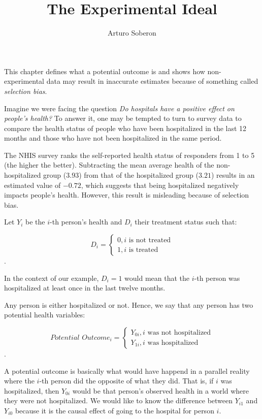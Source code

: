 \documentclass[12pt]{article}
\begin{document}
\title{The Experimental Ideal}
\author{Arturo Soberon}
\maketitle

This chapter defines what a potential outcome is and shows how non-experimental
data may result in inaccurate estimates because of something called 
\textit{selection bias}.

Imagine we were facing the question \textit{Do hospitals have a positive
effect on people's health?} To answer it, one may be tempted to turn to survey
data to compare the health status of people who have been hospitalized in the
last 12 months and those who have not been hospitalized in the same period.

The NHIS survey ranks the self-reported health status of responders from 1 to 
5 (the higher the better). Subtracting the mean average health of the
non-hospitalized group ($3.93$) from that of the hospitalized group ($3.21$)
results in an estimated value of $-0.72$, which suggests that being
hospitalized negatively impacts people's health. However, this result is
misleading because of selection bias.

Let $Y_i$ be the $i$-th person's health and $D_i$ their treatment status such
that:

\begin{equation*}
    D_i = 
    \begin{cases}
        0, \text{$i$ is not treated} \\
        1, \text{$i$ is treated}
    \end{cases}
\end{equation*}.

In the context of our example, $D_i = 1$ would mean that the $i$-th person was
hospitalized at least once in the last twelve months.

Any person is either hospitalized or not. Hence, we say that any person has two
potential health variables:

\begin{equation*}
    \textit{Potential Outcome}_i = 
    \begin{cases}
        Y_{0i}, \text{$i$ was not hospitalized} \\
        Y_{1i}, \text{$i$ was hospitalized}
    \end{cases}
\end{equation*}.

\noindent A potential outcome is basically what would have happend in a
parallel reality where the $i$-th person did the opposite of what they did.
That is, if $i$ was hospitalized, then $Y_{0i}$ would be that person's observed
health in a world where they were not hospitalized. We would like to know the
difference between $Y_{i1}$ and $Y_{i0}$ because it is the causal effect of
going to the hospital for person $i$.
\end{document}
